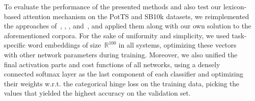 To evaluate the performance of the presented methods and also test our
lexicon-based attention mechanism on the PotTS and SB10k datasets, we
reimplemented the approaches of~\citet{Yessenalina:11},
\citet{Socher:11,Socher:12,Socher:13}, \citet{Severyn:15},
and~\citet{Baziotis:17}, and applied them along with our own solution
to the aforementioned corpora.  For the sake of uniformity and
simplicity, we used task-specific word embeddings of
size~$\mathbb{R}^{100}$ in all systems, optimizing these vectors with
other network parameters during training.  Moreover, we also unified
the final activation parts and cost functions of all networks, using a
densely connected softmax layer as the last component of each
classifier and optimizing their weights w.r.t. the categorical hinge
loss on the training data, picking the values that yielded the highest
accuracy on the validation set.

